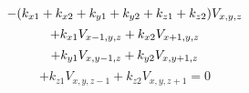 \documentclass[12pt]{article}
\begin{document}
\begin{displaymath}
-(k_{x1}+k_{x2}+k_{y1}+k_{y2}+k_{z1}+k_{z2})V_{x,y,z} \\
\end{displaymath}
\begin{displaymath}
+k_{x1}V_{x-1,y,z}+k_{x2}V_{x+1,y,z} \\
\end{displaymath}
\begin{displaymath}
+k_{y1}V_{x,y-1,z}+k_{y2}V_{x,y+1,z} \\
\end{displaymath}
\begin{displaymath}
+k_{z1}V_{x,y,z-1}+k_{z2}V_{x,y,z+1}=0
\end{displaymath}
\end{document}
